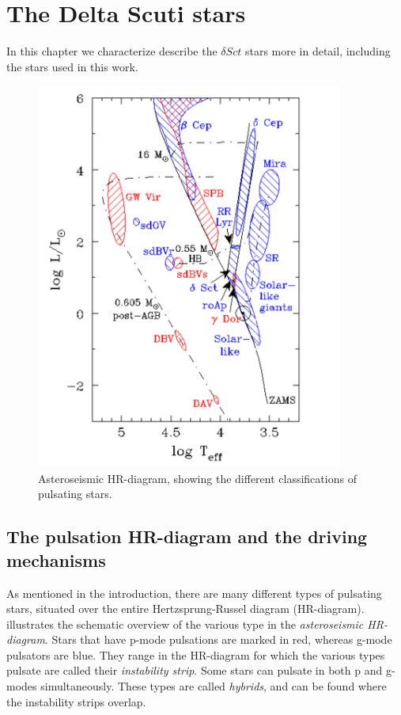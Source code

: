 \chapter{The Delta Scuti stars}
\label{deltascuti}
In this chapter we characterize describe the $\delta Sct$ stars more in detail, including the stars used in this work. 
\begin{figure}[htbp]
    \centering
    \includegraphics[width=0.9\textwidth]{hrpuls.png}
    \caption{Asteroseismic HR-diagram, showing the different classifications of pulsating stars. }
    \label{hrd}
\end{figure}

\section{The pulsation HR-diagram and the driving mechanisms}
As mentioned in the introduction, there are many different types of pulsating stars, situated over the entire Hertzsprung-Russel diagram (HR-diagram).  illustrates the schematic overview of the various type in the \textit{asteroseismic HR-diagram}. Stars that have p-mode pulsations are marked in red, whereas g-mode pulsators are blue. They range in the HR-diagram for which the various types pulsate are called their \textit{instability strip}. Some stars can pulsate in both p and g-modes simultaneously. These types are called \textit{hybrids}, and can be found where the instability strips overlap. 


